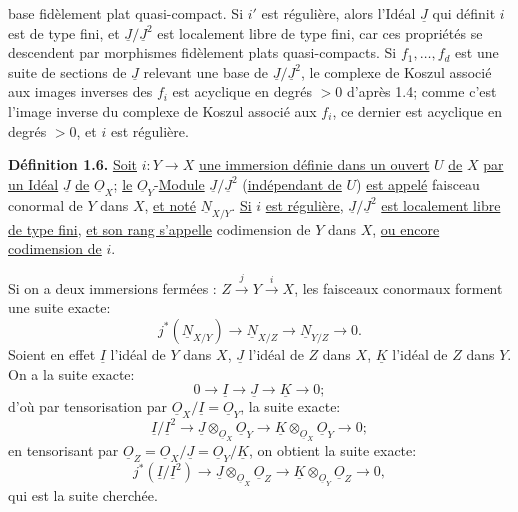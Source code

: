 
base fidèlement plat quasi-compact. Si $i'$ est régulière, alors l'Idéal $\underline{J}$ qui définit $i$ est de type fini, et $\underline{J}/\underline{J}^2$ est localement libre de type fini, car ces propriétés se descendent par morphismes fidèlement plats quasi-compacts. Si $f_1,\ldots,f_d$ est une suite de sections de $\underline{J}$ relevant une base de $\underline{J}/\underline{J}^2$, le complexe de Koszul associé aux images inverses des $f_i$ est acyclique en degrés $>0$ d'après 1.4; comme c'est l'image inverse du complexe de Koszul associé aux $f_i$, ce dernier est acyclique en degrés $>0$, et $i$ est régulière.

\textbf{Définition 1.6.} \uline{Soit} $i:Y\longrightarrow X$ \uline{une immersion définie dans un ouvert} $U$ \uline{de} $X$ \uline{par un Idéal} $\underline{J}$ \uline{de} $\underline{O}_X$; \uline{le} $\underline{O}_Y$-\uline{Module} $\underline{J}/\underline{J}^2$ (\uline{indépendant de} $U$) \uline{est appelé} faisceau conormal de $Y$ dans $X$, \uline{et noté} $\underline{N}_{X/Y}$. \uline{Si} $i$ \uline{est régulière}, $\underline{J}/\underline{J}^2$ \uline{est localement libre de type fini}, \uline{et son rang s'appelle} codimension de $Y$ dans $X$, \uline{ou encore} \uline{codimension de} $i$.

Si on a deux immersions fermées : $Z\xrightarrow{j}Y\xrightarrow{i}X$, les faisceaux conormaux forment une suite exacte:
\begin{equation}\tag{1.6.1}
 j^*(\underline{N}_{X/Y})\longrightarrow \underline{N}_{X/Z}\longrightarrow \underline{N}_{Y/Z}\longrightarrow0.
\end{equation}
Soient en effet $\underline{I}$ l'idéal de $Y$ dans $X$, $\underline{J}$ l'idéal de $Z$ dans $X$, $\underline{K}$ l'idéal de $Z$ dans $Y$. On a la suite exacte:
\[
0\longrightarrow \underline{I}\longrightarrow \underline{J}\longrightarrow \underline{K}\longrightarrow0;
\]
d'où par tensorisation par $\underline{O}_X/\underline{I}=\underline{O}_Y$, la suite exacte:
\[
 \underline{I}/\underline{I}^2\longrightarrow \underline{J}\otimes_{\underline{O}_X}\underline{O}_Y\longrightarrow \underline{K}\otimes_{\underline{O}_X}\underline{O}_Y\longrightarrow0;
\]
en tensorisant par $\underline{O}_Z=\underline{O}_X/\underline{J}=\underline{O}_Y/\underline{K}$, on obtient la suite exacte:
\[
 j^*(\underline{I}/\underline{I}^2)\longrightarrow \underline{J}\otimes_{\underline{O}_X}\underline{O}_Z\longrightarrow \underline{K}\otimes_{\underline{O}_Y}\underline{O}_Z\longrightarrow0,
\]
qui est la suite cherchée.

